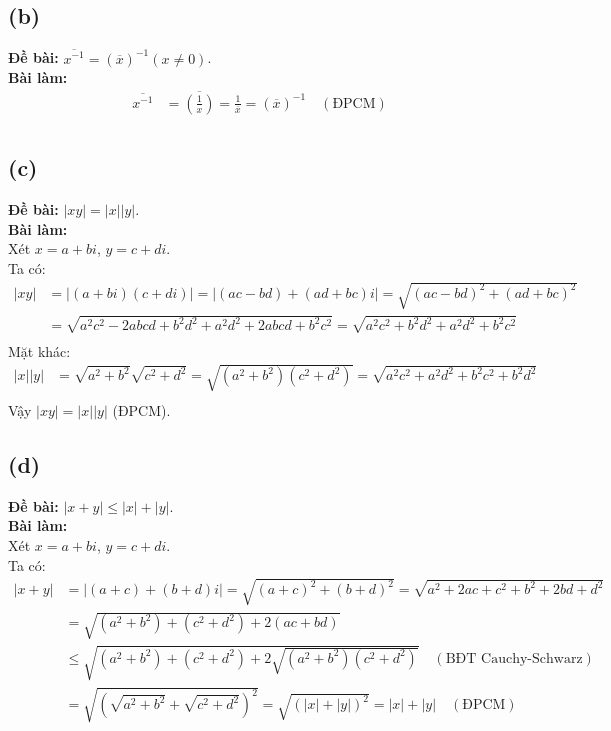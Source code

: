 \subsection{(b)}
\textbf{Đề bài:} $\overline{x^{-1}}=(\overline{x})^{-1}(x\ne0)$.\\
\textbf{Bài làm:}
\begin{align*}
    \overline{x^{-1}} & = \overline{\left(\frac{1}{x}\right)} = \frac{1}{\overline{x}} = (\overline{x})^{-1} \quad (\text{ĐPCM}) \\
\end{align*}

\subsection{(c)}
\textbf{Đề bài:} $|xy|=|x||y|$.\\
\textbf{Bài làm:}
\\Xét $x=a+bi$, $y=c+di$. \\
Ta có:
\begin{align}
    |xy| & = |(a + bi)(c + di)| = |(ac - bd) + (ad + bc)i| = \sqrt{(ac - bd)^{2} + (ad + bc)^{2}}                                                \\
         & = \sqrt{a^{2}c^{2} - 2abcd + b^{2}d^{2} + a^{2}d^{2} + 2abcd + b^{2}c^{2}} = \sqrt{a^{2}c^{2} + b^{2}d^{2} + a^{2}d^{2} + b^{2}c^{2}} \\
\end{align}
Mặt khác:
\begin{align}
    |x||y| & = \sqrt{a^{2} + b^{2}}\sqrt{c^{2} + d^{2}} = \sqrt{(a^{2} + b^{2})(c^{2} + d^{2})} = \sqrt{a^{2}c^{2} + a^{2}d^{2} + b^{2}c^{2} + b^{2}d^{2}} \\
\end{align}
Vậy $|xy| = |x||y|$ (ĐPCM).

\subsection{(d)}
\textbf{Đề bài:} $|x+y|\le|x|+|y|$.\\
\textbf{Bài làm:}\\
Xét $x=a+bi$, $y=c+di$. \\
Ta có:
\begin{align*}
    |x+y| & = |(a+c) + (b+d)i| = \sqrt{(a+c)^{2} + (b+d)^{2}} = \sqrt{a^{2} + 2ac + c^{2} + b^{2} + 2bd + d^{2}}                    \\
          & = \sqrt{(a^{2} + b^{2}) + (c^{2} + d^{2}) + 2(ac + bd)}                                                                 \\
          & \le \sqrt{(a^{2} + b^{2}) + (c^{2} + d^{2}) + 2\sqrt{(a^{2} + b^{2})(c^{2} + d^{2})}} \quad (\text{BĐT Cauchy-Schwarz}) \\
          & = \sqrt{(\sqrt{a^{2} + b^{2}} + \sqrt{c^{2} + d^{2}})^{2}} = \sqrt{(|x| + |y|)^2} =|x| + |y| \quad (\text{ĐPCM})
\end{align*}

